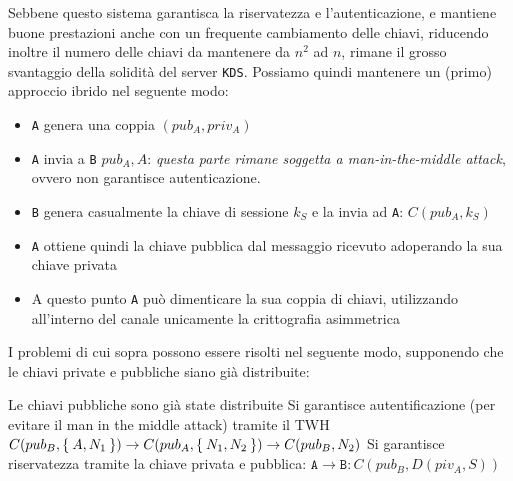 Sebbene questo sistema garantisca la riservatezza e l'autenticazione, e mantiene
buone prestazioni anche con un frequente cambiamento delle chiavi, riducendo
inoltre il numero delle chiavi da mantenere da $n^2$ ad $n$, rimane il grosso
svantaggio della solidità del server \texttt{KDS}. Possiamo quindi mantenere un (primo)
approccio ibrido nel seguente modo:
\begin{itemize}
\item \texttt A genera una coppia $(pub_{A},priv_{A})$
\item \texttt A invia a \texttt B ${pub_A,A}$: \textit{questa parte rimane soggetta a man-in-the-middle attack}, 
	ovvero non garantisce autenticazione.
\item \texttt B genera casualmente la chiave di sessione $k_S$ e la invia ad \texttt A: $C(pub_A,k_S)$
\item \texttt A ottiene quindi la chiave pubblica dal messaggio ricevuto adoperando la sua chiave privata
\item A questo punto \texttt A può dimenticare la sua coppia di chiavi, utilizzando all'interno
	del canale unicamente la crittografia asimmetrica 
\end{itemize}
I problemi di cui sopra possono essere risolti nel seguente modo, supponendo che
le chiavi private e pubbliche siano già distribuite:
\begin{itemize}
\diam Le chiavi pubbliche sono già state distribuite
\diam Si garantisce autentificazione (per evitare il man in the middle attack) tramite il TWH $C(pub_B,\Set{A,N_1})\to C(pub_A,\Set{N_1,N_2})\to C(pub_B,N_2)$
\diam Si garantisce riservatezza tramite la chiave privata e pubblica:
	$\mathtt A\to\mathtt B: C(pub_B,D(piv_A,S))$
\end{itemize}
